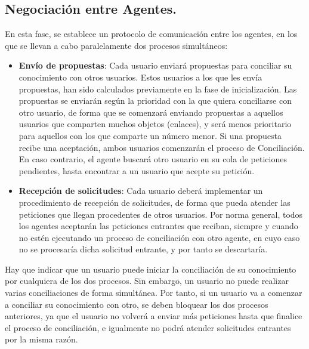 \subsection{Negociación entre Agentes.}

En esta fase, se establece un protocolo de comunicación entre los agentes, en los que se llevan a cabo paralelamente dos procesos simultáneos:

\begin{itemize}
	\item {\bf Envío de propuestas}: Cada usuario enviará propuestas para conciliar su conocimiento con otros usuarios. Estos usuarios a los que les envía propuestas, han sido calculados previamente en la fase de inicialización. Las propuestas se enviarán según la prioridad con la que quiera conciliarse con otro usuario, de forma que se comenzará enviando propuestas a aquellos usuarios que comparten muchos objetos (enlaces), y será menos prioritario para aquellos con los que comparte un número menor. Si una propuesta recibe una aceptación, ambos usuarios comenzarán el proceso de Conciliación. En caso contrario, el agente buscará otro usuario en su cola de peticiones pendientes, hasta encontrar a un usuario que acepte su petición.
	\item {\bf Recepción de solicitudes}: Cada usuario deberá implementar un procedimiento de recepción de solicitudes, de forma que pueda atender las peticiones que llegan procedentes de otros usuarios. Por norma general, todos los agentes aceptarán las peticiones entrantes que reciban, siempre y cuando no estén ejecutando un proceso de conciliación con otro agente, en cuyo caso no se procesaría dicha solicitud entrante, y por tanto se descartaría.
\end{itemize}

Hay que indicar que un usuario puede iniciar la conciliación de su conocimiento por cualquiera de los dos procesos. Sin embargo, un usuario no puede realizar varias conciliaciones de forma simultánea. Por tanto, si un usuario va a comenzar a conciliar su conocimiento con otro, se deben bloquear los dos procesos anteriores, ya que el usuario no volverá a enviar más peticiones hasta que finalice el proceso de conciliación, e igualmente no podrá atender solicitudes entrantes por la misma razón.

